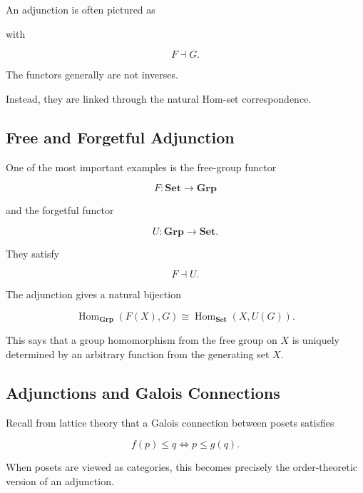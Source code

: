 An adjunction is often pictured as

\begin{center}
\end{center}

with

\[ F\dashv G. \]

The functors generally are not inverses.

Instead, they are linked through the natural Hom-set correspondence.

\subsection{Free and Forgetful Adjunction}
\label{subsec:free-forgetful-adjunction}

One of the most important examples is the free-group functor

\[ F:\mathbf{Set}\to\mathbf{Grp} \]

and the forgetful functor

\[ U:\mathbf{Grp}\to\mathbf{Set}. \]

They satisfy

\[ F\dashv U. \]

The adjunction gives a natural bijection

\[ \operatorname{Hom}_{\mathbf{Grp}}(F(X),G)
\cong
\operatorname{Hom}_{\mathbf{Set}}(X,U(G)). \]

This says that a group homomorphism from the free group on \(X\) is uniquely
determined by an arbitrary function from the generating set \(X\).

\subsection{Adjunctions and Galois Connections}
\label{subsec:adjunctions-galois}

Recall from lattice theory that a Galois connection between posets satisfies

\[ f(p)\leq q\iff p\leq g(q). \]

When posets are viewed as categories, this becomes precisely the
order-theoretic version of an adjunction.

